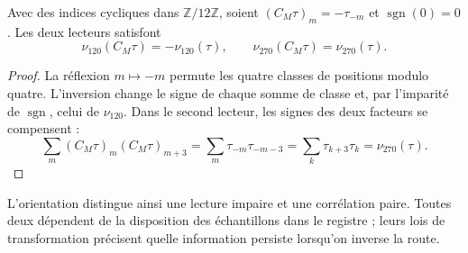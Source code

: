 \begin{proposition}
Avec des indices cycliques dans \(\mathbb Z/12\mathbb Z\), soient
\((C_M\tau)_m=-\tau_{-m}\) et \(\operatorname{sgn}(0)=0\).
Les deux lecteurs satisfont
\[
 \nu_{120}(C_M\tau)=-\nu_{120}(\tau),\qquad
 \nu_{270}(C_M\tau)=\nu_{270}(\tau).
\]
\end{proposition}
\begin{proof}
La réflexion \(m\mapsto-m\) permute les quatre classes de positions
modulo quatre. L'inversion change le signe de chaque somme de classe et,
par l'imparité de \(\operatorname{sgn}\), celui de \(\nu_{120}\).
Dans le second lecteur, les signes des deux facteurs se compensent :
\[
 \sum_m(C_M\tau)_m(C_M\tau)_{m+3}
 =\sum_m\tau_{-m}\tau_{-m-3}
 =\sum_k\tau_{k+3}\tau_k
 =\nu_{270}(\tau).
\]
\end{proof}
L'orientation distingue ainsi une lecture impaire et une corrélation paire.
Toutes deux dépendent de la disposition des échantillons dans le registre ; leurs
lois de transformation précisent quelle information persiste lorsqu'on inverse
la route.

